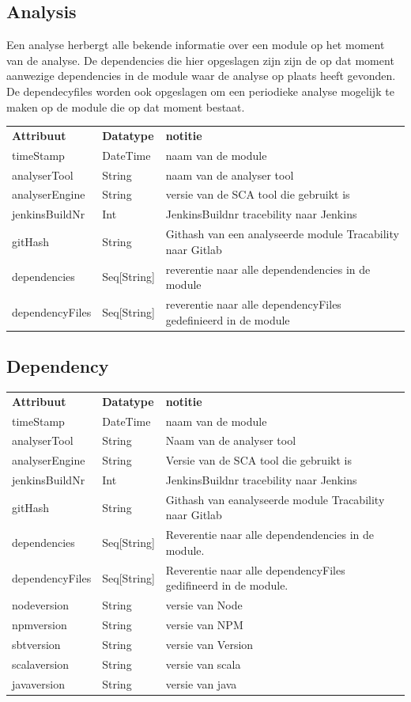\subsection{Analysis}\label{subsec:analysis}
Een analyse herbergt alle bekende informatie over een module op het moment van de analyse. De dependencies die hier opgeslagen zijn zijn de op dat moment aanwezige dependencies in de module waar de analyse op plaats heeft gevonden. De dependecyfiles worden ook opgeslagen om een periodieke analyse mogelijk te maken op de module die op dat moment bestaat.

\begin{tabular}{lll}
    \textbf{Attribuut} & \textbf{Datatype} & \textbf{notitie}\\
    timeStamp & DateTime & naam van de module\\
    analyserTool & String & naam van de analyser tool\\
    analyserEngine & String & versie van de SCA tool die gebruikt is\\
    jenkinsBuildNr & Int & JenkinsBuildnr tracebility naar Jenkins\\
    gitHash & String & Githash van een analyseerde module Tracability naar Gitlab\\
    dependencies & Seq[String] & reverentie naar alle dependendencies in de module\\
    dependencyFiles & Seq[String] & reverentie naar alle dependencyFiles gedefinieerd in de module\\
\end{tabular}


\subsection{Dependency}\label{subsec:dependency}
\begin{tabular}{lll}
    \textbf{Attribuut} & \textbf{Datatype} & \textbf{notitie}\\
    timeStamp & DateTime & naam van de module\\
    analyserTool & String & Naam van de analyser tool\\
    analyserEngine & String & Versie van de SCA tool die gebruikt is\\
    jenkinsBuildNr & Int & JenkinsBuildnr tracebility naar Jenkins\\
    gitHash & String & Githash van  eanalyseerde module Tracability naar Gitlab\\
    dependencies & Seq[String] & Reverentie naar alle dependendencies in de module.\\
    dependencyFiles & Seq[String] & Reverentie naar alle dependencyFiles gedifineerd in de module.\\
    nodeversion & String & versie van Node  \\
    npmversion & String & versie van NPM  \\
    sbtversion & String & versie van Version  \\
    scalaversion & String & versie van scala  \\
    javaversion & String & versie van java \\
\end{tabular}

